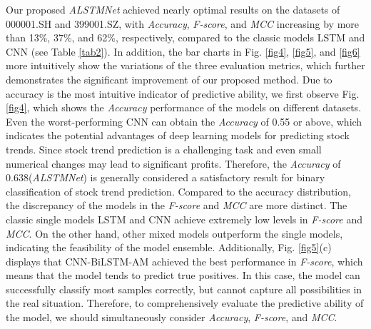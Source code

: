 \documentclass[sn-mathphys]{sn-jnl}%
\theoremstyle{thmstyleone}%
\theoremstyle{thmstyletwo}%
\theoremstyle{thmstylethree}%
\begin{document}
Our proposed {\it ALSTMNet} achieved nearly optimal results on the datasets of 000001.SH and 399001.SZ, with \emph{Accuracy}, \emph{F-score}, and \emph{MCC} increasing by more than 13\%, 37\%, and 62\%, respectively, compared to the classic models LSTM and CNN (see Table \ref{tab2}). In addition, the bar charts in Fig. \ref{fig4}, \ref{fig5}, and \ref{fig6} more intuitively show the variations of the three evaluation metrics, which further demonstrates the significant improvement of our proposed method. Due to accuracy is the most intuitive indicator of predictive ability, we first observe Fig. \ref{fig4}, which shows the \emph{Accuracy} performance of the models on different datasets. Even the worst-performing CNN can obtain the \emph{Accuracy} of 0.55 or above, which indicates the potential advantages of deep learning models for predicting stock trends. Since stock trend prediction is a challenging task and even small numerical changes may lead to significant profits. Therefore, the \emph{Accuracy} of 0.638({\it ALSTMNet}) is generally considered a satisfactory result for binary classification of stock trend prediction. Compared to the accuracy distribution, the discrepancy of the models in the \emph{F-score} and \emph{MCC} are more distinct. The classic single models LSTM and CNN achieve extremely low levels in \emph{F-score} and \emph{MCC}. On the other hand, other mixed models outperform the single models, indicating the feasibility of the model ensemble. Additionally, Fig. \ref{fig5}(c) displays that CNN-BiLSTM-AM achieved the best performance in \emph{F-score}, which means that the model tends to predict true positives. In this case, the model can successfully classify most samples correctly, but cannot capture all possibilities in the real situation. Therefore, to comprehensively evaluate the predictive ability of the model, we should simultaneously consider \emph{Accuracy}, \emph{F-score}, and \emph{MCC}.
\end{document}
